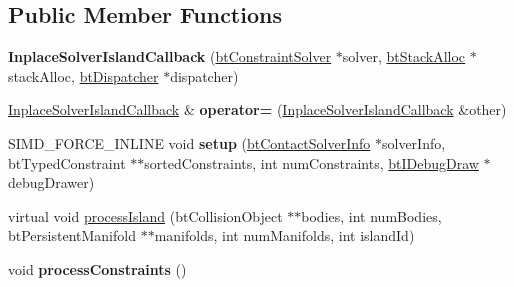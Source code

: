 \subsection*{Public Member Functions}
\begin{DoxyCompactItemize}
\item 
\mbox{\label{structInplaceSolverIslandCallback_a0a65e726e6f3252bb549768351a204b1}} 
{\bfseries Inplace\+Solver\+Island\+Callback} (\hyperlink{classbtConstraintSolver}{bt\+Constraint\+Solver} $\ast$solver, \hyperlink{classbtStackAlloc}{bt\+Stack\+Alloc} $\ast$stack\+Alloc, \hyperlink{classbtDispatcher}{bt\+Dispatcher} $\ast$dispatcher)
\item 
\mbox{\label{structInplaceSolverIslandCallback_a335a17bc631e3f09c7e03d247a9e681d}} 
\hyperlink{structInplaceSolverIslandCallback}{Inplace\+Solver\+Island\+Callback} \& {\bfseries operator=} (\hyperlink{structInplaceSolverIslandCallback}{Inplace\+Solver\+Island\+Callback} \&other)
\item 
\mbox{\label{structInplaceSolverIslandCallback_aee3a949a5d73b02d85565a9aa0355305}} 
S\+I\+M\+D\+\_\+\+F\+O\+R\+C\+E\+\_\+\+I\+N\+L\+I\+NE void {\bfseries setup} (\hyperlink{structbtContactSolverInfo}{bt\+Contact\+Solver\+Info} $\ast$solver\+Info, bt\+Typed\+Constraint $\ast$$\ast$sorted\+Constraints, int num\+Constraints, \hyperlink{classbtIDebugDraw}{bt\+I\+Debug\+Draw} $\ast$debug\+Drawer)
\item 
virtual void \hyperlink{structInplaceSolverIslandCallback_a9f9b7859f93b6c14c83cbe8ca11a02f8}{process\+Island} (bt\+Collision\+Object $\ast$$\ast$bodies, int num\+Bodies, bt\+Persistent\+Manifold $\ast$$\ast$manifolds, int num\+Manifolds, int island\+Id)
\item 
\mbox{\label{structInplaceSolverIslandCallback_a2dcfc2c14ca46c733a6e189e28025f47}} 
void {\bfseries process\+Constraints} ()
\end{DoxyCompactItemize}
